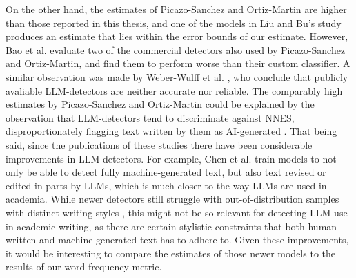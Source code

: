On the other hand, the estimates of Picazo-Sanchez and Ortiz-Martin \cite{Picazo-Sanchez2024} are higher than those reported in this thesis, and one of the models in Liu and Bu's study produces an estimate that lies within the error bounds of our estimate.
However, Bao et al. \cite{Bao2025_classifier} evaluate two of the commercial detectors also used by Picazo-Sanchez and Ortiz-Martin, and find them to perform worse than their custom classifier.
A similar observation was made by Weber-Wulff et al. \cite{Weber-Wulff2023}, who conclude that publicly avaliable LLM-detectors are neither accurate nor reliable.
The comparably high estimates by Picazo-Sanchez and Ortiz-Martin could be explained by the observation that LLM-detectors tend to discriminate against NNES, disproportionately flagging text written by them as AI-generated \cite{Liang2023}.
That being said, since the publications of these studies there have been considerable improvements in LLM-detectors.
For example, Chen et al. \cite{Chen2025_revise} train models to not only be able to detect fully machine-generated text, but also text revised or edited in parts by LLMs, which is much closer to the way LLMs are used in academia.
While newer detectors still struggle with out-of-distribution samples with distinct writing styles \cite{Doughman2025}, this might not be so relevant for detecting LLM-use in academic writing, as there are certain stylistic constraints that both human-written and machine-generated text has to adhere to.
Given these improvements, it would be interesting to compare the estimates of those newer models to the results of our word frequency metric.

